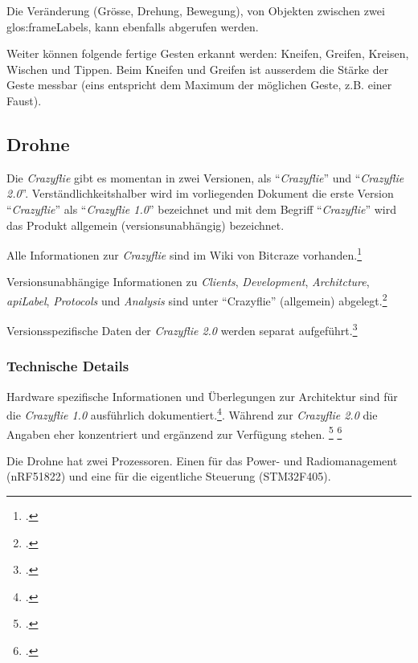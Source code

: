 Die Veränderung (Grösse, Drehung, Bewegung), von Objekten zwischen zwei \glspl{glos:frameLabel}, kann ebenfalls abgerufen werden.

Weiter können folgende fertige Gesten erkannt werden: Kneifen, Greifen, Kreisen, Wischen und Tippen.
Beim Kneifen und Greifen ist ausserdem die Stärke der Geste messbar (eins entspricht dem Maximum der möglichen Geste, z.B. einer Faust).

\subsection{Drohne}
Die \textit{Crazyflie} gibt es momentan in zwei Versionen, als "`\textit{Crazyflie}"' und "`\textit{Crazyflie 2.0}"'. Verständlichkeitshalber wird im vorliegenden Dokument die erste Version "`\textit{Crazyflie}"' als "`\textit{Crazyflie 1.0}"' bezeichnet und mit dem Begriff "`\textit{Crazyflie}"' wird das Produkt allgemein (versionsunabhängig) bezeichnet.

Alle Informationen zur \textit{Crazyflie} sind im Wiki von Bitcraze vorhanden.\footcite{index_Bitcraze_Wiki_2015-03-29}

Versionsunabhängige Informationen zu  \textit{Clients}, \textit{Development}, \textit{Architcture}, \textit{\gls{apiLabel}}, \textit{Protocols} und \textit{Analysis} sind unter "`Crazyflie"' (allgemein) abgelegt.\footcite{doc_crazyflie_index_Bitcraze_Wiki_2015-03-29}

Versionsspezifische Daten der \textit{Crazyflie 2.0} werden separat aufgeführt.\footcite{projects_crazyflie2_index_Bitcraze_Wiki_2015-03-29}

\subsubsection{Technische Details}
Hardware spezifische Informationen und Überlegungen zur Architektur sind für die \textit{Crazyflie 1.0} ausführlich dokumentiert.\footcite{projects_crazyflie_hardware_explained_Bitcraze_Wiki_2015-03-29}.
Während zur \textit{Crazyflie 2.0} die Angaben eher konzentriert und ergänzend zur Verfügung stehen.
\footcite{projects_crazyflie2_architecture_index_Bitcraze_Wiki_2015-03-29}
\footcite{projects_crazyflie2_hardware_specification_Bitcraze_Wiki_2015-03-29}

Die Drohne hat zwei Prozessoren. Einen für das Power- und Radiomanagement (nRF51822) und eine für die eigentliche Steuerung (STM32F405).

